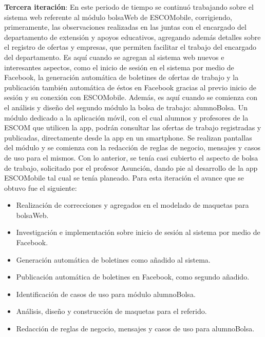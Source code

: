 \noindent
\newline
\textbf{Tercera iteración}: En este periodo de tiempo se continuó trabajando sobre el sistema web referente al módulo bolsaWeb de ESCOMobile, corrigiendo, primeramente, las observaciones realizadas en las juntas con el encargado del departamento de extensión y apoyos educativos, agregando además detalles sobre el registro de ofertas y empresas, que permiten facilitar el trabajo del encargado del departamento. 
\newline
Es aquí cuando se agregan al sistema web nuevos e interesantes aspectos, como el inicio de sesión en el sistema por medio de Facebook, la generación automática de boletines de ofertas de trabajo y la publicación también automática de éstos en Facebook gracias al previo inicio de sesión y su conexión con ESCOMobile.
\newline
\newline
Además, es aquí cuando se comienza con el análisis y diseño del segundo módulo la bolsa de trabajo: alumnoBolsa. Un módulo dedicado a la aplicación móvil, con el cual alumnos y profesores de la ESCOM que utilicen la app, podrán consultar las ofertas de trabajo registradas y publicadas, directamente desde la app en un smartphone. Se realizan pantallas del módulo y se comienza con la redacción de reglas de negocio, mensajes y casos de uso para el mismos.
\newline
Con lo anterior, se tenía casi cubierto el aspecto de bolsa de trabajo, solicitado por el profesor Asunción, dando pie al desarrollo de la app ESCOMobile tal cual se tenía planeado. 
\newline
Para esta iteración el avance que se obtuvo fue el siguiente:
\begin{itemize}
	\item Realización de correcciones y agregados en el modelado de maquetas para bolsaWeb.
	\item Investigación e implementación sobre inicio de sesión al sistema por medio de Facebook.
	\item Generación automática de boletines como añadido al sistema. 
	\item Publicación automática de boletines en Facebook, como segundo añadido.
	\item Identificación de casos de uso para módulo alumnoBolsa.
	\item Análisis, diseño y construcción de maquetas para el referido.
	\item Redacción de reglas de negocio, mensajes y casos de uso para alumnoBolsa.
\end{itemize}

